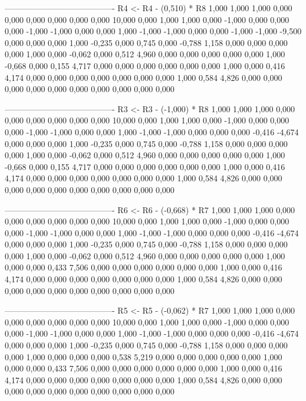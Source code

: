 \documentclass[12pt]{article}
\begin{document}
\begin{enumerate}
\begin{keluaran}
----------------------------------------
R4 <- R4 - (0,510) * R8
1,000   1,000   1,000   0,000   0,000   0,000   0,000   0,000   0,000   10,000
0,000   1,000   1,000   0,000   -1,000  0,000   0,000   0,000   -1,000  -1,000
0,000   0,000   1,000   -1,000  -1,000  0,000   0,000   -1,000  -1,000  -9,500
0,000   0,000   0,000   1,000   -0,235  0,000   0,745   0,000   -0,788  1,158
0,000   0,000   0,000   0,000   1,000   0,000   -0,062  0,000   0,512   4,960
0,000   0,000   0,000   0,000   0,000   1,000   -0,668  0,000   0,155   4,717
0,000   0,000   0,000   0,000   0,000   0,000   1,000   0,000   0,416   4,174
0,000   0,000   0,000   0,000   0,000   0,000   0,000   1,000   0,584   4,826
0,000   0,000   0,000   0,000   0,000   0,000   0,000   0,000   0,000   0,000

----------------------------------------
R3 <- R3 - (-1,000) * R8
1,000   1,000   1,000   0,000   0,000   0,000   0,000   0,000   0,000   10,000
0,000   1,000   1,000   0,000   -1,000  0,000   0,000   0,000   -1,000  -1,000
0,000   0,000   1,000   -1,000  -1,000  0,000   0,000   0,000   -0,416  -4,674
0,000   0,000   0,000   1,000   -0,235  0,000   0,745   0,000   -0,788  1,158
0,000   0,000   0,000   0,000   1,000   0,000   -0,062  0,000   0,512   4,960
0,000   0,000   0,000   0,000   0,000   1,000   -0,668  0,000   0,155   4,717
0,000   0,000   0,000   0,000   0,000   0,000   1,000   0,000   0,416   4,174
0,000   0,000   0,000   0,000   0,000   0,000   0,000   1,000   0,584   4,826
0,000   0,000   0,000   0,000   0,000   0,000   0,000   0,000   0,000   0,000

----------------------------------------
R6 <- R6 - (-0,668) * R7
1,000   1,000   1,000   0,000   0,000   0,000   0,000   0,000   0,000   10,000
0,000   1,000   1,000   0,000   -1,000  0,000   0,000   0,000   -1,000  -1,000
0,000   0,000   1,000   -1,000  -1,000  0,000   0,000   0,000   -0,416  -4,674
0,000   0,000   0,000   1,000   -0,235  0,000   0,745   0,000   -0,788  1,158
0,000   0,000   0,000   0,000   1,000   0,000   -0,062  0,000   0,512   4,960
0,000   0,000   0,000   0,000   0,000   1,000   0,000   0,000   0,433   7,506
0,000   0,000   0,000   0,000   0,000   0,000   1,000   0,000   0,416   4,174
0,000   0,000   0,000   0,000   0,000   0,000   0,000   1,000   0,584   4,826
0,000   0,000   0,000   0,000   0,000   0,000   0,000   0,000   0,000   0,000

----------------------------------------
R5 <- R5 - (-0,062) * R7
1,000   1,000   1,000   0,000   0,000   0,000   0,000   0,000   0,000   10,000
0,000   1,000   1,000   0,000   -1,000  0,000   0,000   0,000   -1,000  -1,000
0,000   0,000   1,000   -1,000  -1,000  0,000   0,000   0,000   -0,416  -4,674
0,000   0,000   0,000   1,000   -0,235  0,000   0,745   0,000   -0,788  1,158
0,000   0,000   0,000   0,000   1,000   0,000   0,000   0,000   0,538   5,219
0,000   0,000   0,000   0,000   0,000   1,000   0,000   0,000   0,433   7,506
0,000   0,000   0,000   0,000   0,000   0,000   1,000   0,000   0,416   4,174
0,000   0,000   0,000   0,000   0,000   0,000   0,000   1,000   0,584   4,826
0,000   0,000   0,000   0,000   0,000   0,000   0,000   0,000   0,000   0,000


\end{keluaran}
\end{enumerate}
\end{document}
